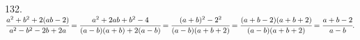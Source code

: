 132. $\cfrac{a^2+b^2+2(ab-2)}{a^2-b^2-2b+2a}=\cfrac{a^2+2ab+b^2-4}{(a-b)(a+b)+2(a-b)}=\cfrac{(a+b)^2-2^2}{(a-b)(a+b+2)}=\cfrac{(a+b-2)(a+b+2)}{(a-b)(a+b+2)}=\cfrac{a+b-2}{a-b}.$\\
